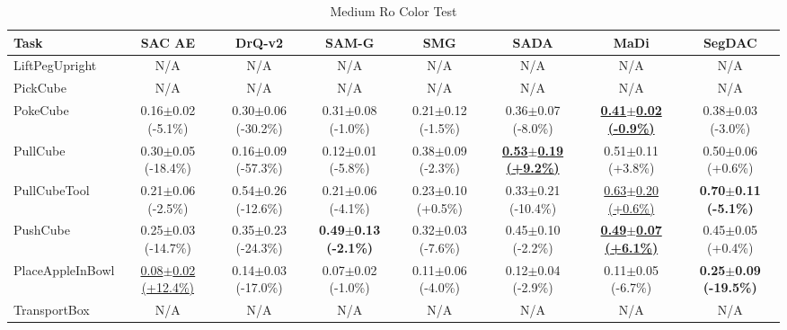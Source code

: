 \begin{table}[htbp]
\centering
\scriptsize
\caption{Medium Ro Color Test}
\label{tab:appendix_rocolortest_medium}
\begin{adjustbox}{max width=\textwidth}
\begin{tabular}{l*{7}{c}}
\toprule
\textbf{Task} & \textbf{SAC AE} & \textbf{DrQ-v2} & \textbf{SAM-G} & \textbf{SMG} & \textbf{SADA} & \textbf{MaDi} & \textbf{SegDAC} \\
\midrule
LiftPegUpright & N/A & N/A & N/A & N/A & N/A & N/A & N/A \\
PickCube & N/A & N/A & N/A & N/A & N/A & N/A & N/A \\
PokeCube & 0.16$\pm$0.02 \scriptsize{(-5.1\%)} & 0.30$\pm$0.06 \scriptsize{(-30.2\%)} & 0.31$\pm$0.08 \scriptsize{(-1.0\%)} & 0.21$\pm$0.12 \scriptsize{(-1.5\%)} & 0.36$\pm$0.07 \scriptsize{(-8.0\%)} & \textbf{\underline{0.41$\pm$0.02 \scriptsize{(-0.9\%)}}} & 0.38$\pm$0.03 \scriptsize{(-3.0\%)} \\
PullCube & 0.30$\pm$0.05 \scriptsize{(-18.4\%)} & 0.16$\pm$0.09 \scriptsize{(-57.3\%)} & 0.12$\pm$0.01 \scriptsize{(-5.8\%)} & 0.38$\pm$0.09 \scriptsize{(-2.3\%)} & \textbf{\underline{0.53$\pm$0.19 \scriptsize{(+9.2\%)}}} & 0.51$\pm$0.11 \scriptsize{(+3.8\%)} & 0.50$\pm$0.06 \scriptsize{(+0.6\%)} \\
PullCubeTool & 0.21$\pm$0.06 \scriptsize{(-2.5\%)} & 0.54$\pm$0.26 \scriptsize{(-12.6\%)} & 0.21$\pm$0.06 \scriptsize{(-4.1\%)} & 0.23$\pm$0.10 \scriptsize{(+0.5\%)} & 0.33$\pm$0.21 \scriptsize{(-10.4\%)} & \underline{0.63$\pm$0.20 \scriptsize{(+0.6\%)}} & \textbf{0.70$\pm$0.11 \scriptsize{(-5.1\%)}} \\
PushCube & 0.25$\pm$0.03 \scriptsize{(-14.7\%)} & 0.35$\pm$0.23 \scriptsize{(-24.3\%)} & \textbf{0.49$\pm$0.13 \scriptsize{(-2.1\%)}} & 0.32$\pm$0.03 \scriptsize{(-7.6\%)} & 0.45$\pm$0.10 \scriptsize{(-2.2\%)} & \textbf{\underline{0.49$\pm$0.07 \scriptsize{(+6.1\%)}}} & 0.45$\pm$0.05 \scriptsize{(+0.4\%)} \\
PlaceAppleInBowl & \underline{0.08$\pm$0.02 \scriptsize{(+12.4\%)}} & 0.14$\pm$0.03 \scriptsize{(-17.0\%)} & 0.07$\pm$0.02 \scriptsize{(-1.0\%)} & 0.11$\pm$0.06 \scriptsize{(-4.0\%)} & 0.12$\pm$0.04 \scriptsize{(-2.9\%)} & 0.11$\pm$0.05 \scriptsize{(-6.7\%)} & \textbf{0.25$\pm$0.09 \scriptsize{(-19.5\%)}} \\
TransportBox & N/A & N/A & N/A & N/A & N/A & N/A & N/A \\
\bottomrule
\end{tabular}
\end{adjustbox}
\end{table}

